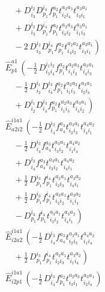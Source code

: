 \documentclass[11pt]{article}
\begin{document}
\begin{align}
&\left.\quad + D^{i_{2}}_{i_{3}} D^{i_{4}}_{p_{1}} f^{a_{2}}_{p_{1}} t^{a_{2}a_{3}}_{i_{2}i_{4}} t^{a_{3}a_{1}}_{i_{3}i_{1}} \right. \\
&\left.\quad + D^{i_{2}}_{i_{3}} D^{i_{4}}_{p_{1}} f^{a_{2}}_{p_{1}} t^{a_{2}a_{3}}_{i_{4}i_{2}} t^{a_{3}a_{1}}_{i_{1}i_{3}} \right. \\
&\left.\quad - 2\, D^{i_{2}}_{i_{3}} D^{i_{4}}_{p_{1}} f^{a_{2}}_{p_{1}} t^{a_{2}a_{3}}_{i_{4}i_{2}} t^{a_{3}a_{1}}_{i_{3}i_{1}} \right) \\
&\hat{E}^{a1}_{p1}\,\left(- \tfrac{1}{2}\, D^{i_{1}i_{2}}_{i_{3}i_{4}} f^{a_{2}}_{p_{1}} t^{a_{2}a_{3}}_{i_{1}i_{2}} t^{a_{3}a_{1}}_{i_{4}i_{3}} \right. \\
&\left.\quad - \tfrac{1}{2}\, D^{i_{1}}_{i_{2}} D^{i_{3}}_{i_{4}} f^{a_{2}}_{p_{1}} t^{a_{2}a_{3}}_{i_{1}i_{3}} t^{a_{3}a_{1}}_{i_{2}i_{4}} \right. \\
&\left.\quad + D^{i_{1}}_{i_{2}} D^{i_{3}}_{i_{4}} f^{a_{2}}_{p_{1}} t^{a_{2}a_{3}}_{i_{1}i_{3}} t^{a_{3}a_{1}}_{i_{4}i_{2}} \right) \\
&\hat{E}^{i1a1}_{a2i2}\,\left(- \tfrac{1}{2}\, D^{i_{3}}_{i_{4}} f^{a_{3}}_{a_{4}} t^{a_{3}a_{1}}_{i_{2}i_{3}} t^{a_{4}a_{2}}_{i_{4}i_{1}} \right. \\
&\left.\quad - \tfrac{1}{2}\, D^{i_{3}}_{i_{4}} f^{a_{3}}_{a_{4}} t^{a_{3}a_{1}}_{i_{3}i_{2}} t^{a_{4}a_{2}}_{i_{1}i_{4}} \right. \\
&\left.\quad + D^{i_{3}}_{i_{4}} f^{a_{3}}_{a_{4}} t^{a_{3}a_{1}}_{i_{3}i_{2}} t^{a_{4}a_{2}}_{i_{4}i_{1}} \right. \\
&\left.\quad + \tfrac{1}{2}\, D^{i_{3}}_{p_{1}} f^{i_{4}}_{p_{1}} t^{a_{3}a_{1}}_{i_{2}i_{3}} t^{a_{3}a_{2}}_{i_{4}i_{1}} \right. \\
&\left.\quad + \tfrac{1}{2}\, D^{i_{3}}_{p_{1}} f^{i_{4}}_{p_{1}} t^{a_{3}a_{1}}_{i_{3}i_{2}} t^{a_{3}a_{2}}_{i_{1}i_{4}} \right. \\
&\left.\quad - D^{i_{3}}_{p_{1}} f^{i_{4}}_{p_{1}} t^{a_{3}a_{1}}_{i_{3}i_{2}} t^{a_{3}a_{2}}_{i_{4}i_{1}} \right) \\
&\hat{E}^{i1a1}_{i2a2}\,\left(- \tfrac{1}{2}\, D^{i_{3}}_{i_{4}} f^{a_{3}}_{a_{4}} t^{a_{3}a_{1}}_{i_{2}i_{3}} t^{a_{4}a_{2}}_{i_{1}i_{4}} \right. \\
&\left.\quad + \tfrac{1}{2}\, D^{i_{3}}_{p_{1}} f^{i_{4}}_{p_{1}} t^{a_{3}a_{1}}_{i_{2}i_{3}} t^{a_{3}a_{2}}_{i_{1}i_{4}} \right) \\
&\hat{E}^{i1a1}_{i2p1}\,\left(- \tfrac{1}{2}\, D^{i_{3}}_{i_{4}} f^{a_{2}}_{p_{1}} t^{a_{2}a_{3}}_{i_{3}i_{1}} t^{a_{3}a_{1}}_{i_{2}i_{4}} \right) \\

\end{align}
\end{document}
